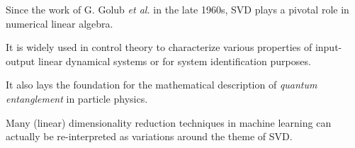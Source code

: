 \documentclass[aspectratio=169, usenames, dvipsnames]{beamer}
\newcommand{\highlightdark}[2]{\colorbox{#1!47}{$\displaystyle #2$}}
\renewcommand{\highlightdark}[2]{\colorbox{#1!47}{#2}}
\begin{document}
\begin{frame}
  \vfill

  Since the work of G. Golub \emph{et al.} in the late 1960s, SVD plays a pivotal role in numerical linear algebra.

  \vfill
\end{frame}

\begin{frame}
  \vfill

  It is widely used in control theory to characterize various properties of input-output linear dynamical systems or for system identification purposes.
  \vfill
\end{frame}

\begin{frame}
  \vfill

  It also lays the foundation for the mathematical description of \emph{quantum entanglement} in particle physics.
  \vfill
\end{frame}

\begin{frame}
  \vfill

  \centering


  \bigskip

  Many (linear) dimensionality reduction techniques in machine learning can actually be re-interpreted as variations around the theme of SVD.

  \vfill
\end{frame}
\end{document}
